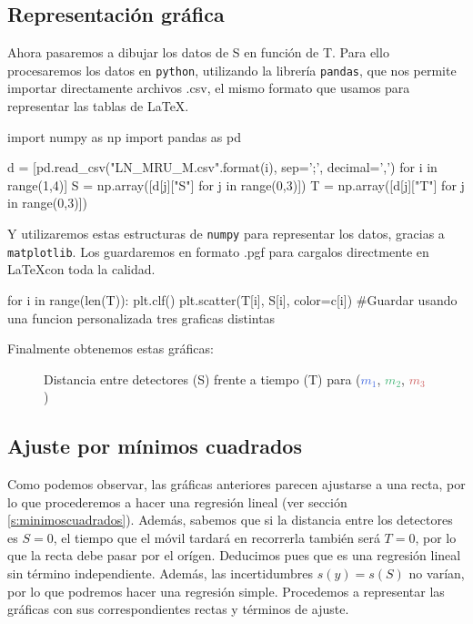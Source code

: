 \documentclass[12pt, a4paper, titlepage]{article}
\newcommand{\code}[1]{\texttt{#1}} %
\begin{document}
  \newpage
  \subsection{Representación gráfica}

  Ahora pasaremos a dibujar los datos de S en función de T. Para ello procesaremos los datos en \code{python}, utilizando la librería \code{pandas}, que nos permite importar directamente archivos .csv, el mismo formato que usamos para representar las tablas de \LaTeX.

  \begin{python}
    import numpy as np
    import pandas as pd

    d = [pd.read_csv("LN_MRU_M{}.csv".format(i), sep=';', decimal=',')
         for i in range(1,4)]
    S = np.array([d[j]["S"] for j in range(0,3)])
    T = np.array([d[j]["T"] for j in range(0,3)])
  \end{python}

  Y utilizaremos estas estructuras de \code{numpy} para representar los datos, gracias a \code{matplotlib}. Los guardaremos en formato .pgf para cargalos directmente en \LaTeX con toda la calidad.

  \begin{python}
    for i in range(len(T)):
        plt.clf()
        plt.scatter(T[i], S[i], color=c[i])
        #Guardar usando una funcion personalizada tres graficas distintas
  \end{python}

  Finalmente obtenemos estas gráficas:
  \begin{figure}[H]
    \hspace{-1.8cm} \centering
     

    \hspace{-1.8cm} 
    \caption{Distancia entre detectores (S) frente a tiempo (T) para  (\textcolor{RoyalBlue}{$m_1$}, \textcolor{MediumSeaGreen}{$m_2$}, \textcolor{IndianRed}{$m_3$})}
  \end{figure}

  \newpage
  \subsection{Ajuste por mínimos cuadrados}

  Como podemos observar, las gráficas anteriores parecen ajustarse a una recta, por lo que procederemos a hacer una regresión lineal (ver sección \ref{s:minimoscuadrados}). Además, sabemos que si la distancia entre los detectores es $S=0$, el tiempo que el móvil tardará en recorrerla también será $T=0$, por lo que la recta debe pasar por el orígen. Deducimos pues que es una regresión lineal sin término independiente. Además, las incertidumbres $s(y) = s(S)$ no varían, por lo que podremos hacer una regresión simple. Procedemos a representar las gráficas con sus correspondientes rectas y términos de ajuste.
\end{document}
